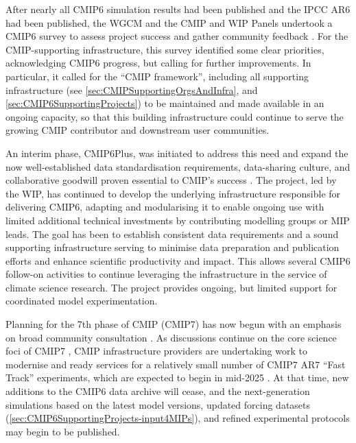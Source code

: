 \documentclass[manuscript]{copernicus}
\begin{document}
After nearly all CMIP6 simulation results had been published and the IPCC AR6 had been published, the WGCM and the CMIP and WIP Panels undertook a CMIP6 survey to assess project success and gather community feedback \citep{orourke_cmip6_2024}. For the CMIP-supporting infrastructure, this survey identified some clear priorities, acknowledging CMIP6 progress, but calling for further improvements. In particular, it called for the ``CMIP framework'', including all supporting infrastructure (see \autoref{sec:CMIPSupportingOrgsAndInfra}, and \autoref{sec:CMIP6SupportingProjects}) to be maintained and made available in an ongoing capacity, so that this building infrastructure could continue to serve the growing CMIP contributor and downstream user communities.

An interim phase, CMIP6Plus, was initiated to address this need and expand the now well-established data standardisation requirements, data-sharing culture, and collaborative goodwill proven essential to CMIP's success \citep{mizielinski_cmip6plus_2024}. The project, led by the WIP, has continued to develop the underlying infrastructure responsible for delivering CMIP6, adapting and modularising it to enable ongoing use with limited additional technical investments by contributing modelling groups or MIP leads. The goal has been to establish consistent data requirements and a sound supporting infrastructure serving to minimise data preparation and publication efforts and enhance scientific productivity and impact. This allows several CMIP6 follow-on activities to continue leveraging the infrastructure in the service of climate science research. The project provides ongoing, but limited support for coordinated model experimentation.

Planning for the 7th phase of CMIP (CMIP7) has now begun with an emphasis on broad community consultation \citep{orourke_cmip6_2024}. As discussions continue on the core science foci of CMIP7 \citep[e.g.,][]{dunne_climate_2023,dunne_evolving_2024}, CMIP infrastructure providers are undertaking work \citep[e.g.,][]{kershaw_esgf_2020} to modernise and ready services for a relatively small number of CMIP7 AR7 ``Fast Track'' experiments, which are expected to begin in mid-2025 \citep{dunne_evolving_2024}. At that time, new additions to the CMIP6 data archive will cease, and the next-generation simulations based on the latest model versions, updated forcing datasets (\autoref{sec:CMIP6SupportingProjects-input4MIPs}), and refined experimental protocols may begin to be published.
\end{document}
